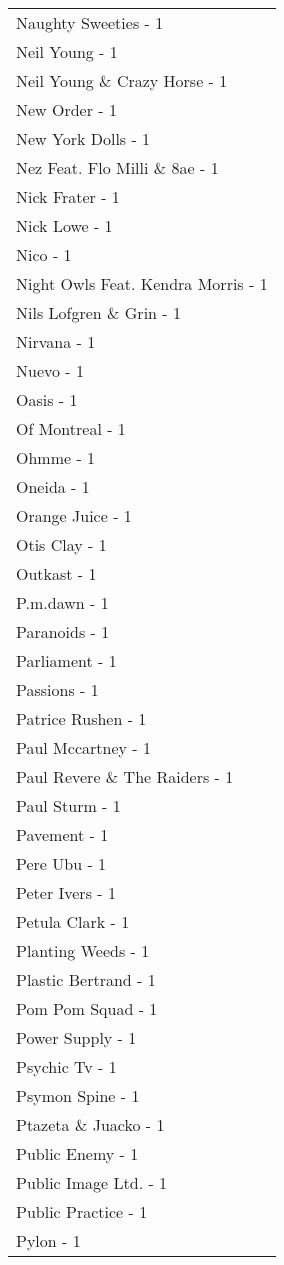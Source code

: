 \documentclass[
]{article}
\begin{document}
\begin{longtable}{l}
Naughty Sweeties - 1 \\ 
Neil Young - 1 \\ 
Neil Young \& Crazy Horse - 1 \\ 
New Order - 1 \\ 
New York Dolls - 1 \\ 
Nez Feat. Flo Milli \& 8ae - 1 \\ 
Nick Frater - 1 \\ 
Nick Lowe - 1 \\ 
Nico - 1 \\ 
Night Owls Feat. Kendra Morris - 1 \\ 
Nils Lofgren \& Grin - 1 \\ 
Nirvana - 1 \\ 
Nuevo - 1 \\ 
Oasis - 1 \\ 
Of Montreal - 1 \\ 
Ohmme - 1 \\ 
Oneida - 1 \\ 
Orange Juice - 1 \\ 
Otis Clay - 1 \\ 
Outkast - 1 \\ 
P.m.dawn - 1 \\ 
Paranoids - 1 \\ 
Parliament - 1 \\ 
Passions - 1 \\ 
Patrice Rushen - 1 \\ 
Paul Mccartney - 1 \\ 
Paul Revere \& The Raiders - 1 \\ 
Paul Sturm - 1 \\ 
Pavement - 1 \\ 
Pere Ubu - 1 \\ 
Peter Ivers - 1 \\ 
Petula Clark - 1 \\ 
Planting Weeds - 1 \\ 
Plastic Bertrand - 1 \\ 
Pom Pom Squad - 1 \\ 
Power Supply - 1 \\ 
Psychic Tv - 1 \\ 
Psymon Spine - 1 \\ 
Ptazeta \& Juacko - 1 \\ 
Public Enemy - 1 \\ 
Public Image Ltd. - 1 \\ 
Public Practice - 1 \\ 
Pylon - 1 \\ 

\end{longtable}
\end{document}
